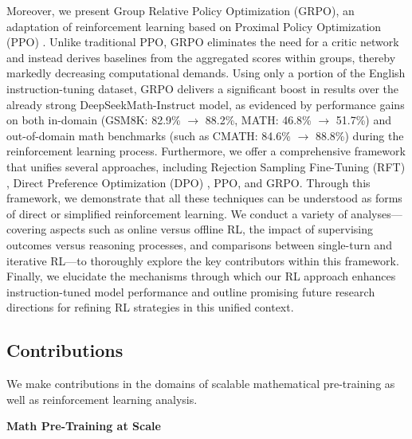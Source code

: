 Moreover, we present Group Relative Policy Optimization (GRPO), an adaptation of reinforcement learning based on Proximal Policy Optimization (PPO) \citep{schulman2017proximal}. Unlike traditional PPO, GRPO eliminates the need for a critic network and instead derives baselines from the aggregated scores within groups, thereby markedly decreasing computational demands. Using only a portion of the English instruction-tuning dataset, GRPO delivers a significant boost in results over the already strong DeepSeekMath-Instruct model, as evidenced by performance gains on both in-domain (GSM8K: 82.9\% $\rightarrow$ 88.2\%, MATH: 46.8\% $\rightarrow$ 51.7\%) and out-of-domain math benchmarks (such as CMATH: 84.6\% $\rightarrow$ 88.8\%) during the reinforcement learning process. Furthermore, we offer a comprehensive framework that unifies several approaches, including Rejection Sampling Fine-Tuning (RFT) \citep{yuan2023scaling}, Direct Preference Optimization (DPO) \citep{dpo}, PPO, and GRPO. Through this framework, we demonstrate that all these techniques can be understood as forms of direct or simplified reinforcement learning. We conduct a variety of analyses—covering aspects such as online versus offline RL, the impact of supervising outcomes versus reasoning processes, and comparisons between single-turn and iterative RL—to thoroughly explore the key contributors within this framework. Finally, we elucidate the mechanisms through which our RL approach enhances instruction-tuned model performance and outline promising future research directions for refining RL strategies in this unified context.

\subsection{Contributions}
We make contributions in the domains of scalable mathematical pre-training as well as reinforcement learning analysis.

\textbf{Math Pre-Training at Scale}

